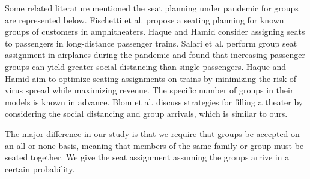 

Some related literature mentioned the seat planning under pandemic for groups are represented below.
Fischetti et al. \cite{fischetti2021safe} propose a seating planning for known groups of customers in amphitheaters. Haque and Hamid \cite{haque2022optimization} consider assigning seats to passengers in long-distance passenger trains. Salari et al. \cite{salari2022social} perform group seat assignment in airplanes during the pandemic and found that increasing passenger groups can yield greater social distancing than single passengers. Haque and Hamid \cite{haque2023social} aim to optimize seating assignments on trains by minimizing the risk of virus spread while maximizing revenue. The specific number of groups in their models is known in advance. Blom et al. \cite{blom2022filling} discuss strategies for filling a theater by considering the social distancing and group arrivals, which is similar to ours. 

The major difference in our study is that we require that groups be accepted on an all-or-none basis, meaning that members of the same family or group must be seated together. We give the seat assignment assuming the groups arrive in a certain probability.





